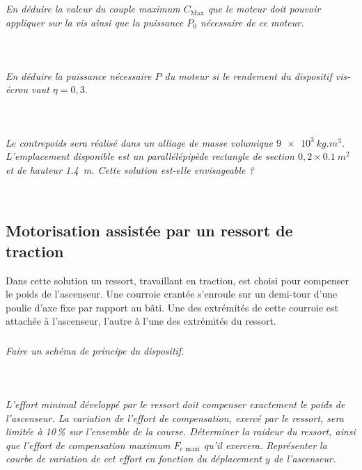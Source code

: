 \begin{multicols}{2}
\subparagraph{}\textit{En déduire la valeur du couple maximum $C_{\text{Max}}$ que le moteur doit pouvoir
appliquer sur la vis ainsi que la puissance $P_0$ nécessaire de ce moteur.}
\ifprof
\begin{corrige}~\\
\end{corrige}
\else
\fi

\subparagraph{}\textit{En déduire la puissance nécessaire $P$ du moteur si le rendement du dispositif vis-écrou vaut $\eta=0,3$.}
\ifprof
\begin{corrige}~\\
\end{corrige}
\else
\fi



\subparagraph{}\textit{Le contrepoids sera réalisé dans un alliage de masse volumique $\SI{9e3}{kg.m^3}$. L’emplacement disponible est un parallélépipède rectangle de
section $0,2 \times \SI{0,1}{m^2}$ et de hauteur \SI{1,4}{m}. Cette solution est-elle envisageable ?}
\ifprof
\begin{corrige}~\\
\end{corrige}
\else
\fi

\subsection*{Motorisation assistée par un ressort de traction}
Dans cette solution un ressort, travaillant en traction, est choisi pour compenser
le poids de l’ascenseur. Une courroie crantée s’enroule sur un demi-tour
d’une poulie d’axe fixe par rapport au bâti. Une des extrémités de cette courroie
est attachée à l’ascenseur, l’autre à l’une des extrémités du ressort.

\subparagraph{}\textit{Faire un schéma de principe du dispositif.}
\ifprof
\begin{corrige}~\\
\end{corrige}
\else
\fi



\subparagraph{}\textit{L’effort minimal développé par le ressort doit compenser exactement le poids
de l’ascenseur. La variation de l’effort de compensation, exercé par le ressort,
sera limitée à 10\,\% sur l’ensemble de la course. Déterminer la raideur du ressort,
ainsi que l’effort de compensation maximum $F_{\text{c maxi}}$ qu’il exercera. Représenter
la courbe de variation de cet effort en fonction du déplacement $y$ de l’ascenseur.}
\ifprof
\begin{corrige}~\\
\end{corrige}
\else
\fi


\end{multicols}
